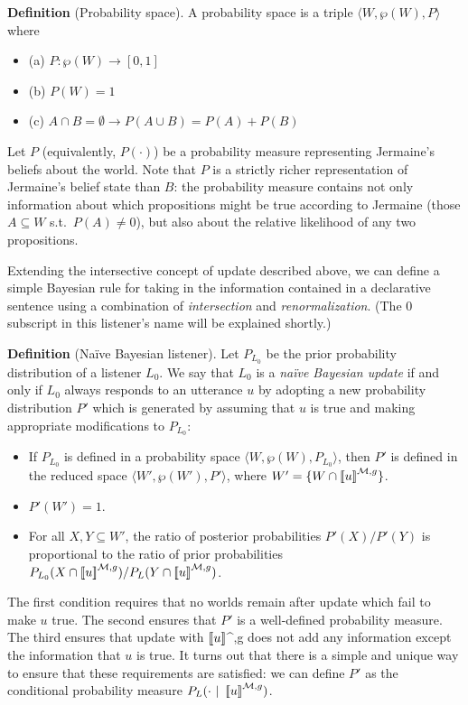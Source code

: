 \documentclass[12pt]{article}
\newcommand{\llbracket}{\ensuremath{\left [\!\left [}}%
\newcommand{\rrbracket}{\ensuremath{\right ]\!\right ]}}
\providecommand{\sv}[1]{\ensuremath{\llbracket #1 \rrbracket}}
\newcommand{\bei}{\begin{itemize}}
\newcommand{\eni}{\end{itemize}}
\newcommand{\lar}[1]{\ensuremath{\langle #1 \rangle}}
\newcounter{definition}
\newcommand{\defin}[2]{
\vspace{.1in}
\noindent \textbf{Definition \arabic{definition}} (#1). #2
\vspace{.1in}
\addtocounter{definition}{1}
}
\begin{document}
\defin{Probability space}{A probability space is a triple \lar{W, \wp(W), P} where
\bei
\item [(a)] $P: \wp(W) \rightarrow [0,1]$
\item [(b)] $P(W) = 1$
\item [(c)] $A \cap B = \emptyset \rightarrow P(A \cup B) = P(A) + P(B)$
\eni
}
Let $P$ (equivalently, $P(\cdot)$) be a probability measure representing Jermaine's beliefs about the world. Note that $P$ is a strictly richer representation of Jermaine's belief state than $B$: the probability measure contains not only information about which propositions might be true according to Jermaine (those $A \subseteq W$ s.t.\ $P(A) \neq 0$), but also about the relative likelihood of any two propositions. 

Extending the intersective concept of update described above, we can define a simple Bayesian rule for taking in the information contained in a declarative sentence using a combination of \emph{intersection} and \emph{renormalization}. (The 0 subscript in this listener's name will be explained shortly.) 

\defin{Na\"ive Bayesian listener}{Let $P_{L_0}$ be the prior probability distribution of a listener $L_0$. We say that $L_0$ is a \emph{na\"ive Bayesian update} if and only if $L_0$ always responds to an utterance $u$ by adopting a new probability distribution $P'$ which is generated by assuming that $u$ is true and making appropriate modifications to $P_{L_0}$: 
\bei
\item If $P_{L_0}$ is defined in a probability space \lar{W, \wp(W), P_{L_0}}, then $P'$ is defined in the reduced space \lar{W', \wp(W'), P'}, where $W' = \{W \cap \sv{u}^{\mathcal{M},g}\}$.
\item $P'(W') = 1$. 
\item For all $X, Y \subseteq W'$, the ratio of posterior probabilities  
$P'(X)/P'(Y)$ is proportional to the ratio of prior probabilities $P_{L_0}(X \cap \sv{u}^{\mathcal{M},g})/P_L(Y \cap \sv{u}^{\mathcal{M},g})$.
\eni
}
The first condition requires that no worlds remain after update which fail to make $u$ true. The second ensures that $P'$ is a well-defined probability measure. The third ensures that update with \sv{u}^{,g} does not add any information except the information that $u$ is true. It turns out that there is a simple and unique way to ensure that these requirements are satisfied: we can define $P'$ as the conditional probability measure $P_L(\cdot \ |\ \sv{u}^{\mathcal{M},g})$.
\end{document}
